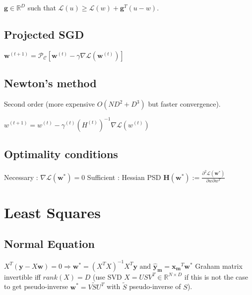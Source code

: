 $\mathbf{g} \in \mathbb{R}^D$ such that $\mathcal{L}(u) \ge \mathcal{L}(w) + \mathbf{g}^T (u-w)$. 


\subsection{Projected SGD}

$\mathbf{w}^{(t+1)} = \mathcal{P_C} [\mathbf{w}^{(t)} - \gamma \nabla \mathcal{L}(\mathbf{w}^{(t)})]$

\subsection{Newton's method}
Second order (more expensive $O(ND^2 + D^3)$ but faster convergence).

$w^{(t+1)} = w^{(t)} - \gamma^{(t)} (H^{(t)})^{-1} \nabla \mathcal{L}(w^{(t)})$


\subsection{Optimality conditions}
Necessary : $\nabla \mathcal{L} (\mathbf{w}^*) = 0$
Sufficient : Hessian PSD $\mathbf{H}(\mathbf{w}^*) := \frac{\partial^2 \mathcal{L}(\mathbf{w}^*)}{\partial w \partial w^T}$


\section{Least Squares}
\subsection{Normal Equation}
$X^T (\mathbf{y} - X\mathbf{w})= 0 \Rightarrow$\newline$\mathbf{w^*} = (X^TX)^{-1}X^T\mathbf{y} \text{ and } \mathbf{\hat{y}_m} = \mathbf{x_m}^T \mathbf{w^*}$
Graham matrix invertible iff $rank(X) = D$ (use SVD $X = USV^T \in \mathbb{R}^{N\times D}$ if this is not the case to get pseudo-inverse $\mathbf{w^*} = V\tilde{S}U^T$ with $\tilde{S}$ pseudo-inverse of $S$).


